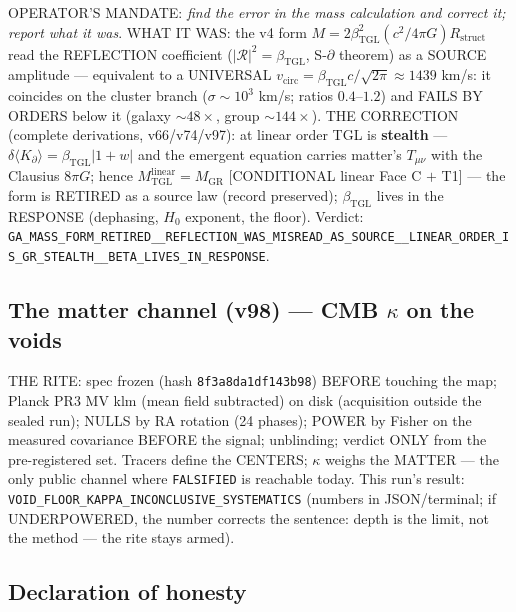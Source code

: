 \documentclass[11pt]{article}
\newcommand{\bTGL}{\beta_{\mathrm{TGL}}}\newcommand{\Msun}{M_{\odot}}\newcommand{\TGL}{\mathrm{TGL}}
\theoremstyle{definition}\newtheorem{deriv}{Derivation}
\begin{document}
OPERATOR'S MANDATE: \emph{find the error in the mass calculation and correct it; report what it was}. WHAT IT WAS: the v4 form $M=2\bTGL^2(c^2/4\pi G)R_{\mathrm{struct}}$ read the REFLECTION coefficient ($|\mathcal R|^2=\bTGL$, S-$\partial$ theorem) as a SOURCE amplitude --- equivalent to a UNIVERSAL $v_{\mathrm{circ}}=\bTGL c/\sqrt{2\pi}\approx1439$ km/s: it coincides on the cluster branch ($\sigma\sim10^3$ km/s; ratios $0.4$--$1.2$) and FAILS BY ORDERS below it (galaxy $\sim48\times$, group $\sim144\times$). THE CORRECTION (complete derivations, v66/v74/v97): at linear order TGL is \textbf{stealth} --- $\delta\langle K_\partial\rangle=\bTGL|1+w|$ and the emergent equation carries matter's $T_{\mu\nu}$ with the Clausius $8\pi G$; hence $M_{\mathrm{TGL}}^{\mathrm{linear}}=M_{\mathrm{GR}}$ [CONDITIONAL linear Face C $+$ T1] --- the form is RETIRED as a source law (record preserved); $\bTGL$ lives in the RESPONSE (dephasing, $H_0$ exponent, the floor). Verdict: \texttt{GA\_MASS\_FORM\_RETIRED\_\_REFLECTION\_WAS\_MISREAD\_AS\_SOURCE\_\_LINEAR\_ORDER\_IS\_GR\_STEALTH\_\_BETA\_LIVES\_IN\_RESPONSE}.

\subsection*{The matter channel (v98) --- CMB $\kappa$ on the voids}

THE RITE: spec frozen (hash \texttt{8f3a8da1df143b98}) BEFORE touching the map; Planck PR3 MV klm (mean field subtracted) on disk (acquisition outside the sealed run); NULLS by RA rotation (24 phases); POWER by Fisher on the measured covariance BEFORE the signal; unblinding; verdict ONLY from the pre-registered set. Tracers define the CENTERS; $\kappa$ weighs the MATTER --- the only public channel where \texttt{FALSIFIED} is reachable today. This run's result: \texttt{VOID\_FLOOR\_KAPPA\_INCONCLUSIVE\_SYSTEMATICS} (numbers in JSON/terminal; if UNDERPOWERED, the number corrects the sentence: depth is the limit, not the method --- the rite stays armed).

\subsection*{Declaration of honesty}
\end{document}
